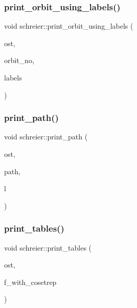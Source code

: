 \subsubsection{\texorpdfstring{print\+\_\+orbit\+\_\+using\+\_\+labels()}{print\_orbit\_using\_labels()}\hspace{0.1cm}{\footnotesize\ttfamily [2/2]}}
{\footnotesize\ttfamily void schreier\+::print\+\_\+orbit\+\_\+using\+\_\+labels (\begin{DoxyParamCaption}\item[{ostream \&}]{ost,  }\item[{\mbox{\hyperlink{galois_8h_a09fddde158a3a20bd2dcadb609de11dc}{I\+NT}}}]{orbit\+\_\+no,  }\item[{\mbox{\hyperlink{galois_8h_a09fddde158a3a20bd2dcadb609de11dc}{I\+NT}} $\ast$}]{labels }\end{DoxyParamCaption})}

\mbox{\label{classschreier_afc535cd4ad0beb7f8b120a2094e129a5}} 
\subsubsection{\texorpdfstring{print\+\_\+path()}{print\_path()}}
{\footnotesize\ttfamily void schreier\+::print\+\_\+path (\begin{DoxyParamCaption}\item[{ostream \&}]{ost,  }\item[{\mbox{\hyperlink{galois_8h_a09fddde158a3a20bd2dcadb609de11dc}{I\+NT}} $\ast$}]{path,  }\item[{\mbox{\hyperlink{galois_8h_a09fddde158a3a20bd2dcadb609de11dc}{I\+NT}}}]{l }\end{DoxyParamCaption})}

\mbox{\label{classschreier_a5716ca3378149c1f21f642395d7831fb}} 
\subsubsection{\texorpdfstring{print\+\_\+tables()}{print\_tables()}}
{\footnotesize\ttfamily void schreier\+::print\+\_\+tables (\begin{DoxyParamCaption}\item[{ostream \&}]{ost,  }\item[{\mbox{\hyperlink{galois_8h_a09fddde158a3a20bd2dcadb609de11dc}{I\+NT}}}]{f\+\_\+with\+\_\+cosetrep }\end{DoxyParamCaption})}

